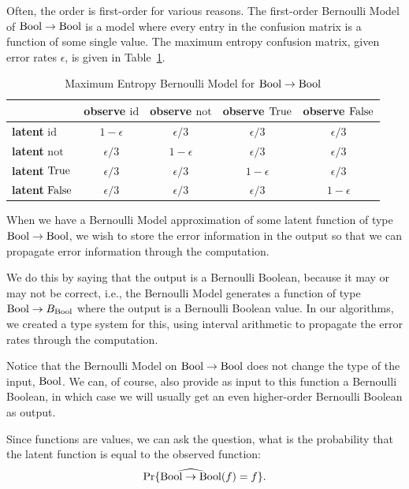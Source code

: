 \documentclass[../main.tex]{subfiles}
\begin{document}
Often, the order is first-order for various reasons. The first-order Bernoulli Model of $\mathrm{Bool} \to \mathrm{Bool}$ is a model where every entry in the confusion matrix is a function of some single value. The maximum entropy confusion matrix, given error rates $\epsilon$, is given in Table~\ref{tbl:max_entropy}.

\begin{table}[htbp]
\centering
\caption{Maximum Entropy Bernoulli Model for $\mathrm{Bool} \to \mathrm{Bool}$}
\label{tbl:max_entropy}
\begin{tabular}{@{}lcccc@{}}
\toprule
& observe $\mathrm{id}$ & observe $\mathrm{not}$ & observe $\mathrm{True}$ & observe $\mathrm{False}$ \\
\midrule
\textbf{latent} $\mathrm{id}$ & $1-\epsilon$ & $\epsilon/3$ & $\epsilon/3$ & $\epsilon/3$ \\
\textbf{latent} $\mathrm{not}$ & $\epsilon/3$ & $1-\epsilon$ & $\epsilon/3$ & $\epsilon/3$ \\
\textbf{latent} $\mathrm{True}$ & $\epsilon/3$ & $\epsilon/3$ & $1-\epsilon$ & $\epsilon/3$ \\
\textbf{latent} $\mathrm{False}$ & $\epsilon/3$ & $\epsilon/3$ & $\epsilon/3$ & $1-\epsilon$ \\
\bottomrule
\end{tabular}
\end{table}

When we have a Bernoulli Model approximation of some latent function of type
$\mathrm{Bool} \to \mathrm{Bool}$, we wish to store the error information in the output so that we can propagate error information through the computation.

We do this by saying that the output is a Bernoulli Boolean, because it may or may not be correct, i.e., the Bernoulli Model generates a function of type $\mathrm{Bool} \to B_{\mathrm{Bool}}$ where the output is a Bernoulli Boolean value. In our algorithms, we created a type system for this, using interval arithmetic to propagate the error rates through the computation.

Notice that the Bernoulli Model on $\mathrm{Bool} \to \mathrm{Bool}$ does not change the type of the input, $\mathrm{Bool}$. We can, of course, also provide as input to this function a Bernoulli Boolean, in which case we will usually get an even higher-order Bernoulli Boolean as output.

Since functions are values, we can ask the question, what is the probability
that the latent function is equal to the observed function:
\begin{equation}
\Pr\{ \widehat{\mathrm{Bool} \to \mathrm{Bool}}(f) = f\}.
\end{equation}
\end{document}
